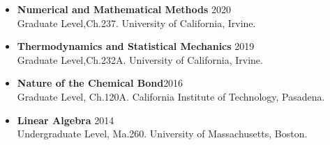\documentclass[letterpaper]{article}
\begin{document}
\begin{itemize}
    \item \textbf{Numerical and Mathematical Methods} \hfill 2020\\
    Graduate Level,Ch.237. University of California, Irvine.
    \vspace{-0.05in}
    \item \textbf{Thermodynamics and Statistical Mechanics
    }\hfill 2019\\
    Graduate Level,Ch.232A. University of California, Irvine.
    \vspace{-0.05in}
    \item \textbf{Nature of the Chemical Bond}\hfill 2016\\
    Graduate Level, Ch.120A. California Institute of Technology, Pasadena.
    \vspace{-0.05in}
    \item \textbf{Linear Algebra} \hfill 2014\\
    Undergraduate Level, Ma.260. University of Massachusetts, Boston.
\end{itemize}
\end{document}
